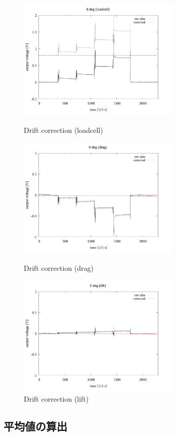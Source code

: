 \documentclass[twocolumn,a4j]{jsarticle}
\begin{document}
\begin{figure}[htbp]
    \footnotesize
    \begin{center}
        \includegraphics[width=78mm]{../images/drift/0_loadcell_drift.png}
        \caption{Drift correction (loadcell)}
        \includegraphics[width=78mm]{../images/drift/0_drag_drift.png}
        \caption{Drift correction (drag)}
        \includegraphics[width=78mm]{../images/drift/0_lift_drift.png}
        \caption{Drift correction (lift)}
    \end{center}
\end{figure}

\newpage

\subsection{平均値の算出}
\end{document}
